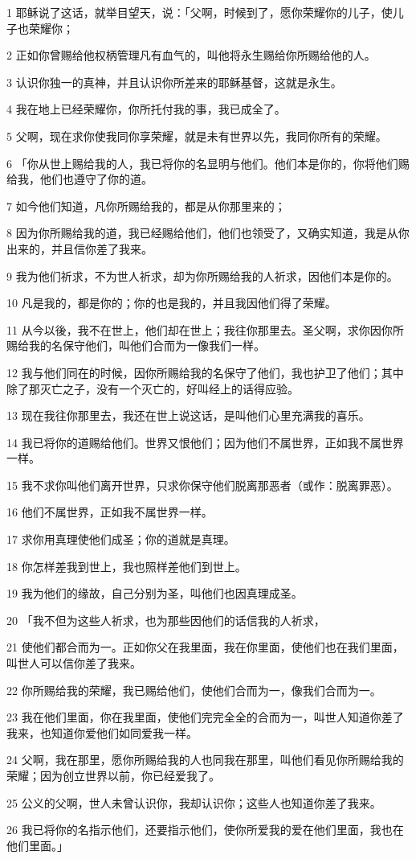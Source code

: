 \par 1 耶稣说了这话，就举目望天，说：「父啊，时候到了，愿你荣耀你的儿子，使儿子也荣耀你；
\par 2 正如你曾赐给他权柄管理凡有血气的，叫他将永生赐给你所赐给他的人。
\par 3 认识你独一的真神，并且认识你所差来的耶稣基督，这就是永生。
\par 4 我在地上已经荣耀你，你所托付我的事，我已成全了。
\par 5 父啊，现在求你使我同你享荣耀，就是未有世界以先，我同你所有的荣耀。
\par 6 「你从世上赐给我的人，我已将你的名显明与他们。他们本是你的，你将他们赐给我，他们也遵守了你的道。
\par 7 如今他们知道，凡你所赐给我的，都是从你那里来的；
\par 8 因为你所赐给我的道，我已经赐给他们，他们也领受了，又确实知道，我是从你出来的，并且信你差了我来。
\par 9 我为他们祈求，不为世人祈求，却为你所赐给我的人祈求，因他们本是你的。
\par 10 凡是我的，都是你的；你的也是我的，并且我因他们得了荣耀。
\par 11 从今以後，我不在世上，他们却在世上；我往你那里去。圣父啊，求你因你所赐给我的名保守他们，叫他们合而为一像我们一样。
\par 12 我与他们同在的时候，因你所赐给我的名保守了他们，我也护卫了他们；其中除了那灭亡之子，没有一个灭亡的，好叫经上的话得应验。
\par 13 现在我往你那里去，我还在世上说这话，是叫他们心里充满我的喜乐。
\par 14 我已将你的道赐给他们。世界又恨他们；因为他们不属世界，正如我不属世界一样。
\par 15 我不求你叫他们离开世界，只求你保守他们脱离那恶者（或作：脱离罪恶）。
\par 16 他们不属世界，正如我不属世界一样。
\par 17 求你用真理使他们成圣；你的道就是真理。
\par 18 你怎样差我到世上，我也照样差他们到世上。
\par 19 我为他们的缘故，自己分别为圣，叫他们也因真理成圣。
\par 20 「我不但为这些人祈求，也为那些因他们的话信我的人祈求，
\par 21 使他们都合而为一。正如你父在我里面，我在你里面，使他们也在我们里面，叫世人可以信你差了我来。
\par 22 你所赐给我的荣耀，我已赐给他们，使他们合而为一，像我们合而为一。
\par 23 我在他们里面，你在我里面，使他们完完全全的合而为一，叫世人知道你差了我来，也知道你爱他们如同爱我一样。
\par 24 父啊，我在那里，愿你所赐给我的人也同我在那里，叫他们看见你所赐给我的荣耀；因为创立世界以前，你已经爱我了。
\par 25 公义的父啊，世人未曾认识你，我却认识你；这些人也知道你差了我来。
\par 26 我已将你的名指示他们，还要指示他们，使你所爱我的爱在他们里面，我也在他们里面。」

